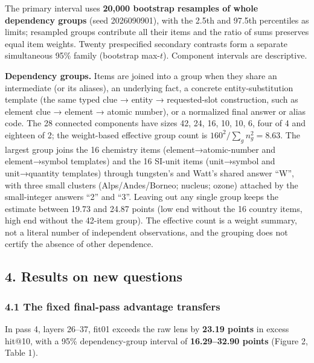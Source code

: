 \documentclass[
  british,
  11pt,
  a4paper,
]{article}
\begin{document}
The primary interval uses \textbf{20,000 bootstrap resamples of whole
dependency groups} (seed 2026090901), with the 2.5th and 97.5th
percentiles as limits; resampled groups contribute all their items and
the ratio of sums preserves equal item weights. Twenty prespecified
secondary contrasts form a separate simultaneous 95\% family (bootstrap
max-\(t\)). Component intervals are descriptive.

\textbf{Dependency groups.} Items are joined into a group when they
share an intermediate (or its aliases), an underlying fact, a concrete
entity-substitution template (the same typed clue → entity →
requested-slot construction, such as element clue → element → atomic
number), or a normalized final answer or alias code. The 28 connected
components have sizes 42, 24, 16, 10, 10, 6, four of 4 and eighteen of
2; the weight-based effective group count is
\(160^2/\sum_g n_g^2 = 8.63\). The largest group joins the 16 chemistry
items (element→atomic-number and element→symbol templates) and the 16
SI-unit items (unit→symbol and unit→quantity templates) through
tungsten's and Watt's shared answer ``W'', with three small clusters
(Alps/Andes/Borneo; nucleus; ozone) attached by the small-integer
answers ``2'' and ``3''. Leaving out any single group keeps the estimate
between 19.73 and 24.87 points (low end without the 16 country items,
high end without the 42-item group). The effective count is a weight
summary, not a literal number of independent observations, and the
grouping does not certify the absence of other dependence.

\subsection{4. Results on new questions}\label{results-on-new-questions}

\subsubsection{4.1 The fixed final-pass advantage
transfers}\label{the-fixed-final-pass-advantage-transfers}

In pass 4, layers 26--37, fit01 exceeds the raw lens by \textbf{23.19
points} in excess hit@10, with a 95\% dependency-group interval of
\textbf{16.29--32.90 points} (Figure 2, Table 1).
\end{document}

